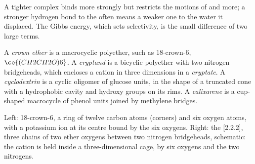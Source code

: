 A tighter complex binds more strongly but restricts the motions of  and
 more; a stronger hydrogen bond to the  often means a weaker one to
the water it displaced. The Gibbs energy, which sets selectivity, is the small
difference of two large terms.

\begin{definition}[Hosts]\label{def:b3:supramolecular:hosts}
A \emph{crown ether} is a macrocyclic polyether, such as
18-crown-6, $\ce{(CH2CH2O)6}$. A \emph{cryptand} is a bicyclic
polyether with two nitrogen bridgeheads, which encloses a cation in three
dimensions in a \emph{cryptate}. A
\emph{cyclodextrin} is a cyclic oligomer of glucose units, in
the shape of a truncated cone with a hydrophobic cavity and hydroxy groups on
its rims. A \emph{calixarene} is a cup-shaped macrocycle of
phenol units joined by methylene bridges.
\end{definition}

\begin{omfigure}

{\small Left: 18-crown-6, a ring of twelve carbon atoms (corners) and six oxygen
atoms, with a potassium ion at its centre bound by the six oxygens. Right: the
[2.2.2], three chains of two ether oxygens between two nitrogen
bridgeheads, schematic: the cation is held inside a three-dimensional cage,
by six oxygens and the two nitrogens.}
\end{omfigure}

